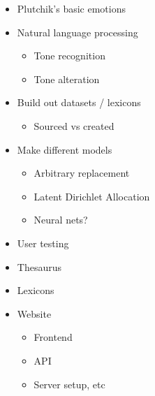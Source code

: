 \documentclass[12pt, oneside, reqno]{article}
\begin{document}


\startmain


\begin{itemize}
\item Plutchik's basic emotions
\item Natural language processing
\begin{itemize}
  \item Tone recognition
  \item Tone alteration
\end{itemize}
\end{itemize}



\begin{itemize}
  \item Build out datasets / lexicons
  \begin{itemize}
    \item Sourced vs created
  \end{itemize}
  \item Make different models
  \begin{itemize}
    \item Arbitrary replacement
    \item Latent Dirichlet Allocation
    \item Neural nets?
  \end{itemize}
  \item User testing
\end{itemize}



\begin{itemize}
  \item Thesaurus
  \item Lexicons
  \item Website
  \begin{itemize}
    \item Frontend
    \item API
    \item Server setup, etc
  \end{itemize}
\end{itemize}

\end{document}
